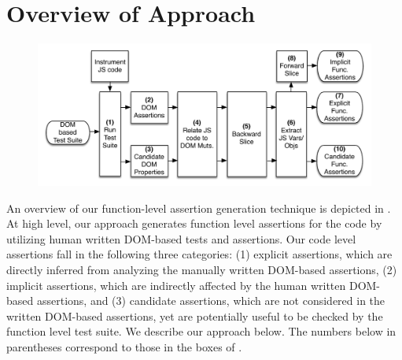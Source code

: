 \section{Overview of Approach} \label{Sec:approach}

\begin{figure}[!t]
  \centering
  \includegraphics[width=.7\hsize]{fig/approachDiagram}
  \vspace{-0.1in} 
  \label{Fig:approachDiagram}
  \vspace{-0.1in} 
\end{figure}
An overview of our \javascript function-level assertion generation technique is depicted in .
At high level, our approach generates function level assertions for the \javascript code by utilizing human written DOM-based tests and assertions. Our code level assertions fall in the following three categories: (1) explicit assertions, which are directly inferred from analyzing the manually written DOM-based assertions, (2) implicit assertions, which are indirectly affected by the human written DOM-based assertions, and (3) candidate assertions, which are not considered in the written DOM-based assertions, yet are potentially useful to be checked by the function level test suite. We describe our approach below. The numbers below in parentheses correspond to those in the boxes of .

